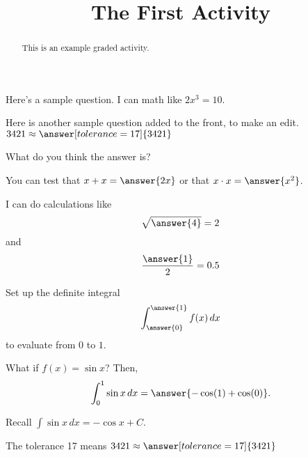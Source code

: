 \documentclass{ximera}
\title{The First Activity}
\begin{document}
\begin{abstract}
This is an example graded activity.
\end{abstract}
\maketitle

Here's a sample question.  I can math like $2x^3 = 10$.

\begin{problem}
   Here is another sample question added to the front, to make an edit. $3421 \approx \answer[tolerance=17]{3421}$
\end{problem}

\begin{problem}
  What do you think the answer is?

  \begin{multipleChoice}
  \end{multipleChoice}
\end{problem}

\begin{problem}
  \begin{multipleChoice}
  \end{multipleChoice}
\end{problem}

\begin{problem}
  You can test that $x + x = \answer{2x}$
  or that $x \cdot x = \answer{x^2}$.

  I can do calculations like
  \[
    \sqrt{\answer{4}} = 2
  \]
  and
  \[
    \frac{\answer{1}}{2} = 0.5
  \]
\end{problem}

\begin{problem}
  Set up the definite integral
    \[
      \int_{\answer{0}}^{\answer{1}} f(x) \, dx
    \]
  to evaluate from $0$ to $1$.

  \begin{question}
    What if $f(x) = \sin x$?  Then,
    \[
       \int_0^1 \sin x \, dx = \answer{-\cos(1) + \cos(0)}.
    \]

    \begin{hint}
      Recall $\int \sin x \, dx = -\cos x + C$.
    \end{hint}
  \end{question}
\end{problem}

\begin{problem}
   The tolerance 17 means $3421 \approx \answer[tolerance=17]{3421}$
\end{problem}
\end{document}
